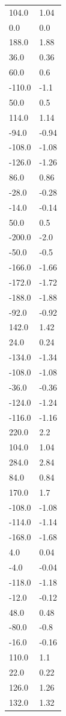 \begin{longtable}{ll}
104.0 & 1.04 \\
0.0 & 0.0 \\
188.0 & 1.88 \\
36.0 & 0.36 \\
60.0 & 0.6 \\
-110.0 & -1.1 \\
50.0 & 0.5 \\
114.0 & 1.14 \\
-94.0 & -0.94 \\
-108.0 & -1.08 \\
-126.0 & -1.26 \\
86.0 & 0.86 \\
-28.0 & -0.28 \\
-14.0 & -0.14 \\
50.0 & 0.5 \\
-200.0 & -2.0 \\
-50.0 & -0.5 \\
-166.0 & -1.66 \\
-172.0 & -1.72 \\
-188.0 & -1.88 \\
-92.0 & -0.92 \\
142.0 & 1.42 \\
24.0 & 0.24 \\
-134.0 & -1.34 \\
-108.0 & -1.08 \\
-36.0 & -0.36 \\
-124.0 & -1.24 \\
-116.0 & -1.16 \\
220.0 & 2.2 \\
104.0 & 1.04 \\
284.0 & 2.84 \\
84.0 & 0.84 \\
170.0 & 1.7 \\
-108.0 & -1.08 \\
-114.0 & -1.14 \\
-168.0 & -1.68 \\
4.0 & 0.04 \\
-4.0 & -0.04 \\
-118.0 & -1.18 \\
-12.0 & -0.12 \\
48.0 & 0.48 \\
-80.0 & -0.8 \\
-16.0 & -0.16 \\
110.0 & 1.1 \\
22.0 & 0.22 \\
126.0 & 1.26 \\
132.0 & 1.32 \\

\end{longtable}
